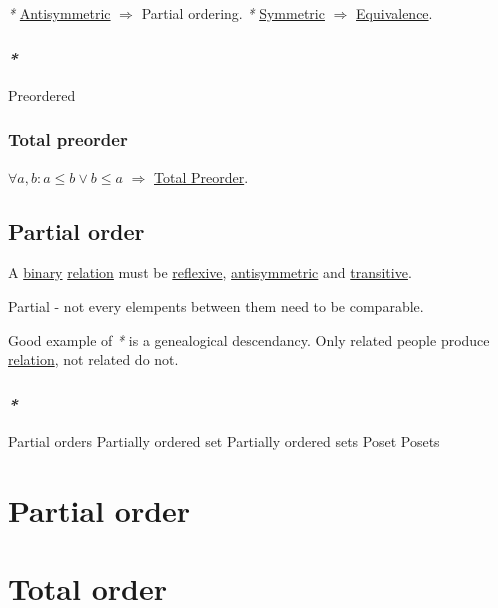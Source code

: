 \documentclass[a4paper,14pt,oneside]{book}
\begin{document}
\emph{*} \hyperref[orgd129364]{Antisymmetric} \(\Rightarrow\) Partial ordering.
\emph{*} \hyperref[org652bcc0]{Symmetric} \(\Rightarrow\) \hyperref[orgcbf1d90]{Equivalence}.

\subsubsection{\emph{*}}
\label{sec:org16604f2}

\label{org17b208e}Preordered

\subsubsection{\label{org554aa32}Total preorder}
\label{sec:orga6a24a2}

\(\forall a,b : a \le b \lor b \le a\) \(\Rightarrow\) \hyperref[org554aa32]{Total Preorder}.

\subsection{\label{org03048ca}Partial order}
\label{sec:org942688b}

A \hyperref[org66cafdd]{binary} \hyperref[org1512a6f]{relation} must be \hyperref[orgd7aac37]{reflexive}, \hyperref[orgd129364]{antisymmetric} and \hyperref[org141a3a1]{transitive}.

Partial - not every elempents between them need to be comparable.

Good example of \emph{*} is a genealogical descendancy. Only related people produce \hyperref[org1512a6f]{relation}, not related do not.

\subsubsection{\emph{*}}
\label{sec:orgf4b6654}

\label{orga792432}Partial orders
\label{org1ebf1b4}Partially ordered set
\label{org674a210}Partially ordered sets
\label{orgd39ddda}Poset
\label{org4eafd6e}Posets

\section{\label{org0979dec}Partial order}
\label{sec:orgc3fd70a}

\section{\label{org2c53485}Total order}
\label{sec:org6426d69}
\end{document}
